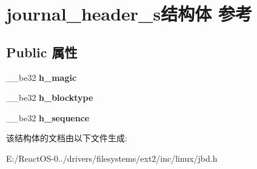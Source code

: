 \hypertarget{structjournal__header__s}{}\section{journal\+\_\+header\+\_\+s结构体 参考}
\label{structjournal__header__s}
\subsection*{Public 属性}
\begin{DoxyCompactItemize}
\item 
\mbox{\label{structjournal__header__s_a6eff3a0f7bb89f60fd18138d30cf28cf}} 
\+\_\+\+\_\+be32 {\bfseries h\+\_\+magic}
\item 
\mbox{\label{structjournal__header__s_a232786a80053ace8cae59353a7039e0d}} 
\+\_\+\+\_\+be32 {\bfseries h\+\_\+blocktype}
\item 
\mbox{\label{structjournal__header__s_aa17e14054ab65a0d21a668a49bb19b43}} 
\+\_\+\+\_\+be32 {\bfseries h\+\_\+sequence}
\end{DoxyCompactItemize}


该结构体的文档由以下文件生成\+:\begin{DoxyCompactItemize}
\item 
E\+:/\+React\+O\+S-\/0../drivers/filesystems/ext2/inc/linux/jbd.\+h\end{DoxyCompactItemize}
